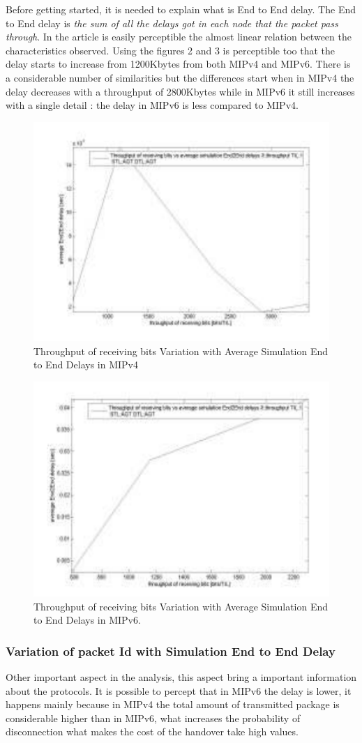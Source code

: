 \documentclass[12pt]{article}
\begin{document}
Before getting started, it is needed to explain what is End to End delay. The End to End delay is \textit{the sum of all the delays got in each node that the packet pass through}. In the article is easily perceptible the almost linear relation between the characteristics observed. Using the figures 2 and 3 is perceptible too that the delay starts to increase from 1200Kbytes from both MIPv4 and MIPv6. There is a considerable number of similarities but the differences start when in MIPv4 the delay decreases with a throughput of 2800Kbytes while in MIPv6 it still increases with a single detail : the delay in MIPv6 is less compared to MIPv4.

\begin{figure}[ht]
\centering
\includegraphics[width=.3\textwidth]{topico1_mipv4.png}
\caption{Throughput of receiving bits Variation with Average Simulation End to End Delays in MIPv4}
\label{fig:topico1_mipv4}
\end{figure}


\begin{figure}[ht]
\centering
\includegraphics[width=.3\textwidth]{topico1_mipv6.png}
\caption{Throughput of receiving bits Variation with Average Simulation End to End Delays in MIPv6.}
\label{fig:topico1_mipv6}
\end{figure}
  


\subsubsection{Variation of packet Id with Simulation End to End Delay}
Other important aspect in the analysis, this aspect bring a important information about the protocols. It is possible to percept that in MIPv6 the delay is lower, it happens mainly because in MIPv4 the total amount of transmitted package is considerable higher than in MIPv6, what increases the probability of disconnection what makes the cost of the handover take high values.
\end{document}
